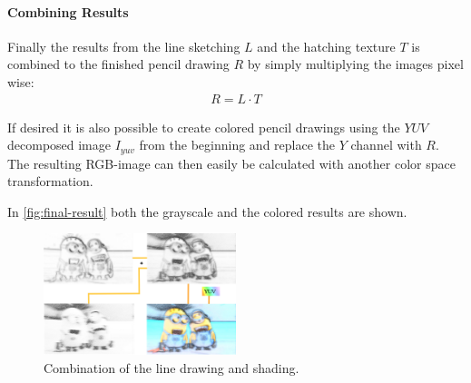 \paragraph{Combining Results}
Finally the results from the line sketching $L$ and the hatching texture $T$ is
combined to the finished pencil drawing $R$ by simply multiplying the images
pixel wise:
\begin{align*}
  R = L  \cdot T
\end{align*}

If desired it is also possible to create colored pencil drawings using the $YUV$
decomposed image $I_{yuv}$ from the beginning and replace the $Y$ channel with
$R$. The resulting RGB-image can then easily be calculated with another color
space transformation.

In \autoref{fig:final-result} both the grayscale and the colored results are shown.

\begin{figure}[htb]
  \centering
  \includegraphics[width=0.5\textwidth]{images/final-result.png}
  \caption{Combination of the line drawing and shading.}
  \label{fig:final-result}
\end{figure}
